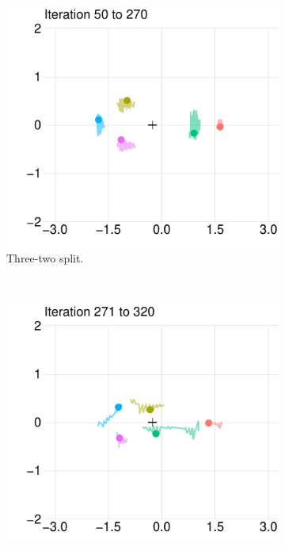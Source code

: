 \documentclass[preprint, 12pt]{elsarticle}
\begin{document}
\begin{figure}[hb!]
	\centering
	\caption{Trajectory plot for five \emph{maxcov-inductor-GA} firms at different iteration intervals ($\mu=1.3$ and $n_l/n_r=1.5$). The dots indicate the location after respective 270, 320 and 2,500 iterations and the lines indicate the location in preceding iterations. The black cross indicates the average ideal point of all consumers.}
	
	\begin{subfigure}[t]{0.315\textwidth}
		\centering
		\includegraphics[width=\textwidth, trim={6mm 0 2mm 0}]{Graphics/fig6m_miga1.pdf}
		\caption{Three-two split.}
		\label{fig:five32}
	\end{subfigure}
	~
	\begin{subfigure}[t]{0.315\textwidth}
		\centering
		\includegraphics[width=\textwidth, trim={6mm 0 2mm 0}]{Graphics/fig6m_miga2.pdf}

\end{subfigure}
\end{figure}
\end{document}
